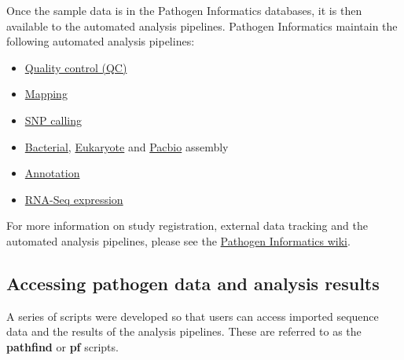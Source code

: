 \documentclass[11pt]{article}
\providecommand{\tightlist}{%
      \setlength{\itemsep}{0pt}\setlength{\parskip}{0pt}}
\begin{document}
Once the sample data is in the Pathogen Informatics databases, it is
then available to the automated analysis pipelines. Pathogen Informatics
maintain the following automated analysis pipelines:

\begin{itemize}
\tightlist
\item
  \href{http://mediawiki.internal.sanger.ac.uk/index.php/Pathogen_Sequencing_Informatics\#QC_Pipeline}{Quality
  control (QC)}
\item
  \href{http://mediawiki.internal.sanger.ac.uk/index.php/Pathogen_Informatics_Mapping_Pipeline}{Mapping}
\item
  \href{http://mediawiki.internal.sanger.ac.uk/index.php/Pathogen_Informatics_SNP_Calling_Pipeline}{SNP
  calling}
\item
  \href{http://mediawiki.internal.sanger.ac.uk/index.php/Pathogen_Informatics_Bacterial_Assembly_Pipeline}{Bacterial},
  \href{http://mediawiki.internal.sanger.ac.uk/index.php/Pathogen_Informatics_Eukaryote_Assembly_Pipeline}{Eukaryote}
  and
  \href{http://mediawiki.internal.sanger.ac.uk/index.php/Pathogen_Informatics_Automated_PacBio_Assembly_Pipeline}{Pacbio}
  assembly
\item
  \href{http://mediawiki.internal.sanger.ac.uk/index.php/Pathogen_Informatics_Automated_Annotation_Pipeline}{Annotation}
\item
  \href{http://mediawiki.internal.sanger.ac.uk/index.php/Pathogen_Informatics_RNA-Seq_Expression_Pipeline}{RNA-Seq
  expression}
\end{itemize}

For more information on study registration, external data tracking and
the automated analysis pipelines, please see the
\href{http://mediawiki.internal.sanger.ac.uk/index.php/Pathogen_Informatics}{Pathogen
Informatics wiki}.

\hypertarget{accessing-pathogen-data-and-analysis-results}{%
\subsection{Accessing pathogen data and analysis
results}\label{accessing-pathogen-data-and-analysis-results}}

A series of scripts were developed so that users can access imported
sequence data and the results of the analysis pipelines. These are
referred to as the \textbf{pathfind} or \textbf{pf} scripts.
\end{document}

